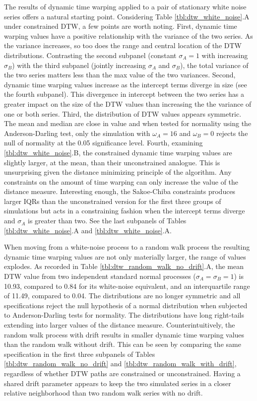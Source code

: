 \documentclass[12pt]{report}
\begin{document}
The results of dynamic time warping applied to a pair of stationary white noise series offers a natural starting point. Considering Table \ref{tbl:dtw_white_noise}.A under constrained DTW, a few points are worth noting. First, dynamic time warping values have a positive relationship with the variance of the two series. As the variance increases, so too does the range and central location of the DTW distributions. Contrasting the second subpanel (constant $\sigma_{A}=1$ with increasing $\sigma_{B}$) with the third subpanel (jointly increasing $\sigma_{A}$ and $\sigma_{B}$), the total variance of the two series matters less than the max value of the two variances. Second, dynamic time warping values increase as the intercept terms diverge in size (see the fourth subpanel). This divergence in intercept between the two series has a greater impact on the size of the DTW values than increasing the the variance of one or both series. Third, the distribution of DTW values appears symmetric. The mean and median are close in value and when tested for normality using the Anderson-Darling test, only the simulation with $\omega_{A}=16$ and $\omega_{B}=0$ rejects the null of normality at the 0.05 significance level. Fourth, examining \ref{tbl:dtw_white_noise}.B, the constrained dynamic time warping values are slightly larger, at the mean, than their unconstrained analogue. This is unsurprising given the distance minimizing principle of the algorithm. Any constraints on the amount of time warping can only increase the value of the distance measure. Interesting enough, the Sakoe-Chiba constraints produces larger IQRs than the unconstrained version for the first three groups of simulations but acts in a constraining fashion when the intercept terms diverge and $\sigma_{A}$ is greater than two. See the last subpanels of Tables \ref{tbl:dtw_white_noise}.A and \ref{tbl:dtw_white_noise}.A.

When moving from a white-noise process to a random walk process the resulting dynamic time warping values are not only materially larger, the range of values explodes. As recorded in Table \ref{tbl:dtw_random_walk_no_drift}.A, the mean DTW value from two independent standard normal processes ($\sigma_{A}=\sigma_{B}=1$) is 10.93, compared to 0.84 for its white-noise equivalent, and an interquartile range of 11.49, compared to 0.04. The distributions are no longer symmetric and all specifications reject the null hypothesis of a normal distribution when subjected to Anderson-Darling tests for normality. The distributions have long right-tails extending into larger values of the distance measure. Counterintuitively, the random walk process with drift results in smaller dynamic time warping values than the random walk without drift. This can be seen by comparing the same specification in the first three subpanels of Tables \ref{tbl:dtw_random_walk_no_drift} and \ref{tbl:dtw_random_walk_with_drift}, regardless of whether DTW paths are constrained or unconstrained. Having a shared drift parameter appears to keep the two simulated series in a closer relative neighborhood than two random walk series with no drift.
\end{document}

